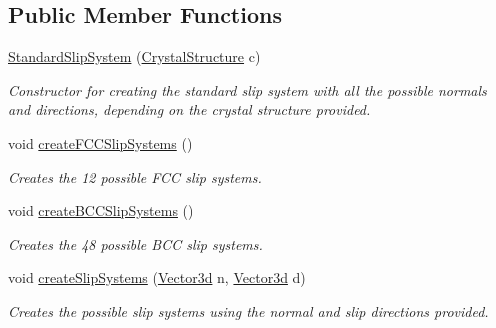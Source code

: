 \subsection*{\-Public \-Member \-Functions}
\begin{DoxyCompactItemize}
\item 
\hyperlink{classStandardSlipSystem_aae11c41e2c75974b053460fd31a800a3}{\-Standard\-Slip\-System} (\hyperlink{standardSlipSystem_8h_a2b9137254fde9c5a395814a81375f441}{\-Crystal\-Structure} c)
\begin{DoxyCompactList}\small\item\em \-Constructor for creating the standard slip system with all the possible normals and directions, depending on the crystal structure provided. \end{DoxyCompactList}\item 
void \hyperlink{classStandardSlipSystem_a858593f0b75144a98b878623d9fa5ba6}{create\-F\-C\-C\-Slip\-Systems} ()
\begin{DoxyCompactList}\small\item\em \-Creates the 12 possible \-F\-C\-C slip systems. \end{DoxyCompactList}\item 
void \hyperlink{classStandardSlipSystem_a0e16ffd0edb356391c897dc2d9d081b5}{create\-B\-C\-C\-Slip\-Systems} ()
\begin{DoxyCompactList}\small\item\em \-Creates the 48 possible \-B\-C\-C slip systems. \end{DoxyCompactList}\item 
void \hyperlink{classStandardSlipSystem_a64a1d61c4f43a2cec6aa9000bd8c2231}{create\-Slip\-Systems} (\hyperlink{classVector3d}{\-Vector3d} n, \hyperlink{classVector3d}{\-Vector3d} d)
\begin{DoxyCompactList}\small\item\em \-Creates the possible slip systems using the normal and slip directions provided. \end{DoxyCompactList}\end{DoxyCompactItemize}
